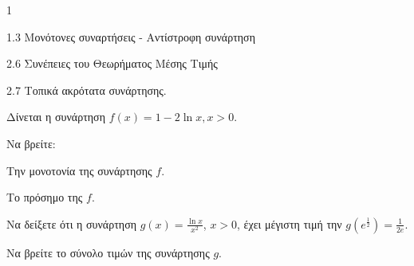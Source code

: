 \begin{ylh}{1}
    \item 1.3 Μονότονες συναρτήσεις - Αντίστροφη συνάρτηση
    \item 2.6 Συνέπειες του Θεωρήματος Μέσης Τιμής
    \item 2.7 Τοπικά ακρότατα συνάρτησης.
\end{ylh}
Δίνεται η συνάρτηση $f(x)=1-2\ln x, x>0$.
\begin{alist}
\item Να βρείτε:
    \begin{rlist}
    \item Την μονοτονία της συνάρτησης $f$. 
    \item Το πρόσημο της $f$. 
    \end{rlist}
\item
    \begin{rlist}
    \item Να δείξετε ότι η συνάρτηση $g(x)=\frac{\ln x}{x^2}$, $x>0$, έχει μέγιστη τιμή την $g\left(e^{\frac{1}{2}}\right)=\frac{1}{2e}$. 
    \item Να βρείτε το σύνολο τιμών της συνάρτησης $g$. 
    \end{rlist}
\end{alist}